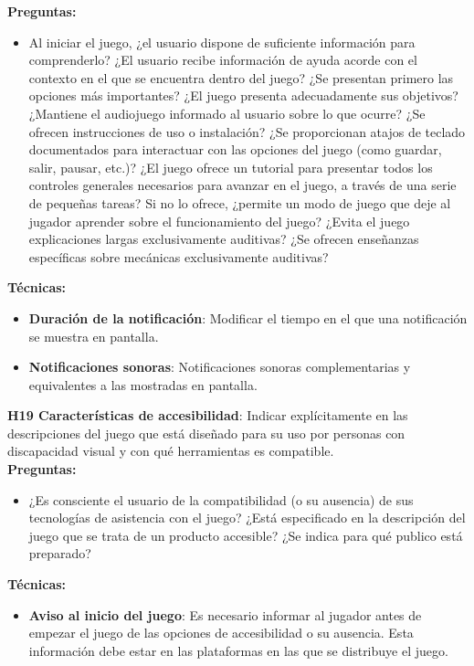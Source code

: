 \textbf{Preguntas:}
\begin{itemize}
	\item  Al iniciar el juego, ¿el usuario dispone de suficiente información para comprenderlo? ¿El usuario recibe información de ayuda acorde con el contexto en el que se encuentra dentro del juego? ¿Se presentan primero las opciones más importantes? ¿El juego presenta adecuadamente sus objetivos? ¿Mantiene el audiojuego informado al usuario sobre lo que ocurre? ¿Se ofrecen instrucciones de uso o instalación? ¿Se proporcionan atajos de teclado documentados para interactuar con las opciones del juego (como guardar, salir, pausar, etc.)? ¿El juego ofrece un tutorial para presentar todos los controles generales necesarios para avanzar en el juego, a través de una serie de pequeñas tareas? Si no lo ofrece, ¿permite un modo de juego  que deje al jugador aprender sobre el funcionamiento del juego? ¿Evita el juego explicaciones largas exclusivamente auditivas? ¿Se ofrecen enseñanzas específicas sobre mecánicas exclusivamente auditivas?
\end{itemize}
\textbf{Técnicas:}
\begin{itemize}
	\item \textbf{Duración de la notificación}: Modificar el tiempo en el que una notificación se muestra en pantalla. \cite{LibroBlancoAccesibilidad} 
	\item \textbf{Notificaciones sonoras}: Notificaciones sonoras complementarias y equivalentes a las mostradas en pantalla. \cite{LibroBlancoAccesibilidad} 
\end{itemize}
\textbf{H19 Características de accesibilidad}: Indicar explícitamente en las descripciones del juego que está diseñado para su uso por personas con discapacidad visual y con qué herramientas es compatible. \cite{teixeiraborgesFairPlayGuidelines2018a}\\
\textbf{Preguntas:}
\begin{itemize}
	\item  ¿Es consciente el usuario de la compatibilidad (o su ausencia) de sus tecnologías de asistencia con el juego? ¿Está especificado en la descripción del juego que se trata de un producto accesible? ¿Se indica para qué publico está preparado?
\end{itemize}
\textbf{Técnicas:}
\begin{itemize}
	\item \textbf{Aviso al inicio del juego}: Es necesario informar al jugador antes de empezar el juego de las opciones de accesibilidad o su ausencia. Esta información debe estar en las plataformas en las que se distribuye el juego. \cite{araujoMobileAudioGames2017a}
\end{itemize}

